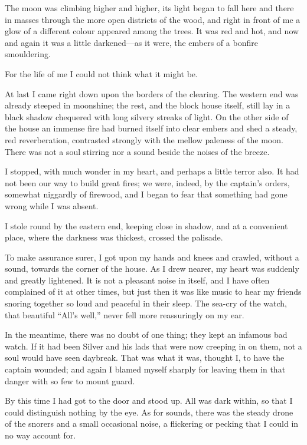 The moon was climbing higher and higher, its light began to fall here and there in masses through the more open districts of the wood, and right in front of me a glow of a different colour appeared among the trees. It was red and hot, and now and again it was a little darkened---as it were, the embers of a bonfire smouldering.

For the life of me I could not think what it might be.

At last I came right down upon the borders of the clearing. The western end was already steeped in moonshine; the rest, and the block house itself, still lay in a black shadow chequered with long silvery streaks of light. On the other side of the house an immense fire had burned itself into clear embers and shed a steady, red reverberation, contrasted strongly with the mellow paleness of the moon. There was not a soul stirring nor a sound beside the noises of the breeze.

I stopped, with much wonder in my heart, and perhaps a little terror also. It had not been our way to build great fires; we were, indeed, by the captain’s orders, somewhat niggardly of firewood, and I began to fear that something had gone wrong while I was absent.

I stole round by the eastern end, keeping close in shadow, and at a convenient place, where the darkness was thickest, crossed the palisade.

To make assurance surer, I got upon my hands and knees and crawled, without a sound, towards the corner of the house. As I drew nearer, my heart was suddenly and greatly lightened. It is not a pleasant noise in itself, and I have often complained of it at other times, but just then it was like music to hear my friends snoring together so loud and peaceful in their sleep. The sea-cry of the watch, that beautiful \enquote{All’s well,} never fell more reassuringly on my ear.

In the meantime, there was no doubt of one thing; they kept an infamous bad watch. If it had been Silver and his lads that were now creeping in on them, not a soul would have seen daybreak. That was what it was, thought I, to have the captain wounded; and again I blamed myself sharply for leaving them in that danger with so few to mount guard.

By this time I had got to the door and stood up. All was dark within, so that I could distinguish nothing by the eye. As for sounds, there was the steady drone of the snorers and a small occasional noise, a flickering or pecking that I could in no way account for.

